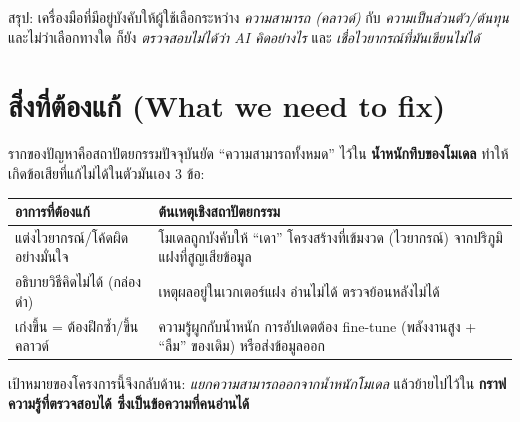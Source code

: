 \documentclass[fontsize=16pt,a4paper]{scrartcl}
\begin{document}

\noindent สรุป: เครื่องมือที่มีอยู่บังคับให้ผู้ใช้เลือกระหว่าง \emph{ความสามารถ (คลาวด์)} กับ \emph{ความเป็นส่วนตัว/ต้นทุน} และไม่ว่าเลือกทางใด ก็ยัง \emph{ตรวจสอบไม่ได้ว่า AI คิดอย่างไร} และ \emph{เชื่อไวยากรณ์ที่มันเขียนไม่ได้}

\section{สิ่งที่ต้องแก้ (What we need to fix)}
รากของปัญหาคือสถาปัตยกรรมปัจจุบันยัด ``ความสามารถทั้งหมด'' ไว้ใน \textbf{น้ำหนักทึบของโมเดล} ทำให้เกิดข้อเสียที่แก้ไม่ได้ในตัวมันเอง 3 ข้อ:

\begin{table}[H]\centering\small
\begin{tabular}{@{}>{\raggedright\arraybackslash}p{5.0cm}>{\raggedright\arraybackslash}p{10.3cm}@{}}
\toprule
\textbf{อาการที่ต้องแก้} & \textbf{ต้นเหตุเชิงสถาปัตยกรรม}\\
\midrule
แต่งไวยากรณ์/โค้ดผิดอย่างมั่นใจ & โมเดลถูกบังคับให้ ``เดา'' โครงสร้างที่เข้มงวด (ไวยากรณ์) จากปริภูมิแฝงที่สูญเสียข้อมูล\\
อธิบายวิธีคิดไม่ได้ (กล่องดำ) & เหตุผลอยู่ในเวกเตอร์แฝง อ่านไม่ได้ ตรวจย้อนหลังไม่ได้\\
เก่งขึ้น = ต้องฝึกซ้ำ/ขึ้นคลาวด์ & ความรู้ผูกกับน้ำหนัก การอัปเดตต้อง fine-tune (พลังงานสูง + ``ลืม'' ของเดิม) หรือส่งข้อมูลออก\\
\bottomrule
\end{tabular}
\end{table}

\noindent เป้าหมายของโครงการนี้จึงกลับด้าน: \emph{แยกความสามารถออกจากน้ำหนักโมเดล} แล้วย้ายไปไว้ใน \textbf{กราฟความรู้ที่ตรวจสอบได้ ซึ่งเป็นข้อความที่คนอ่านได้}

\end{document}
